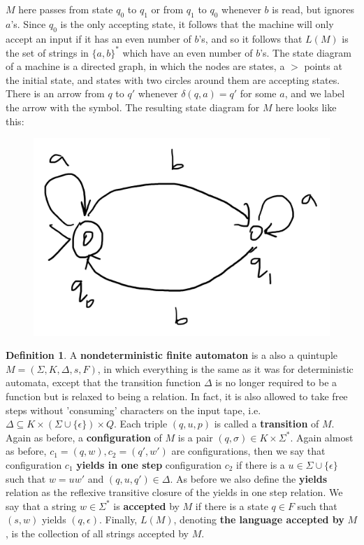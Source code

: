 \documentclass{article}
\theoremstyle{definition}
\newtheorem{definition}{Definition}[section]
\theoremstyle{plain}
\theoremstyle{theorem}
\begin{document}
$M$ here passes from state $q_0$ to $q_1$ or from $q_1$ to $q_0$ whenever $b$ is read, but ignores $a$'s. Since $q_0$ is the only accepting state, it follows that the machine will only accept an input if it has an even number of $b$'s, and so it follows that $L(M)$ is the set of strings in $\{a,b\}^*$ which have an even number of $b$'s. The state diagram of a machine is a directed graph, in which the nodes are states, a $>$ points at the initial state, and states with two circles around them are accepting states. There is an arrow from $q$ to $q'$ whenever $\delta(q,a) = q'$ for some $a$, and we label the arrow with the symbol. The resulting state diagram for $M$ here looks like this:
\begin{figure}[H]
	\centering
  \includegraphics[width=0.4\linewidth]{std1.png}
  \label{fig:test1}
\end{figure}
\begin{definition}
	A \textbf{nondeterministic finite automaton} is a also a quintuple $M = (\Sigma,K,\Delta,s,F)$, in which everything is the same as it was for deterministic automata, except that the transition function $\Delta$ is no longer required to be a function but is relaxed to being a relation. In fact, it is also allowed to take free steps without 'consuming' characters on the input tape, i.e. $\Delta \subseteq K \times (\Sigma \cup \{\epsilon\}) \times Q$. Each triple $(q,u,p)$ is called a \textbf{transition} of $M$. Again as before, a \textbf{configuration} of $M$ is a pair $(q,\sigma) \in K \times \Sigma^*$. Again almost as before, $c_1 = (q,w),c_2 = (q',w')$ are configurations, then we say that configuration $c_1$ \textbf{yields in one step} configuration $c_2$ if there is a $u \in \Sigma \cup \{\epsilon\}$ such that $w=uw'$ and $(q,u,q') \in \Delta$. As before we also define the \textbf{yields} relation as the reflexive transitive closure of the yields in one step relation. We say that a string $w \in \Sigma^*$ is \textbf{accepted} by $M$ if there is a state $q \in F$ such that $(s,w)$ yields $(q,\epsilon)$. Finally, $L(M)$, denoting \textbf{the language accepted by} $M$, is the collection of all strings accepted by $M$.
\end{definition}
\end{document}
